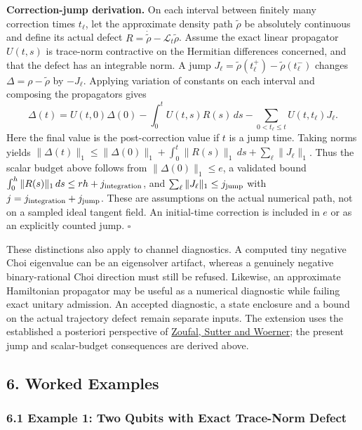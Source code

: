 \documentclass[
  11pt,
]{article}
\begin{document}
\textbf{Correction-jump derivation.} On each interval between finitely many correction times \(t_\ell\), let the approximate density path \(\widetilde\rho\) be absolutely continuous and define its actual defect \(R=\dot{\widetilde\rho}-\mathcal L_t\widetilde\rho\). Assume the exact linear propagator \(U(t,s)\) is trace-norm contractive on the Hermitian differences concerned, and that the defect has an integrable norm. A jump \(J_\ell=\widetilde\rho(t_\ell^+)-\widetilde\rho(t_\ell^-)\) changes \(\Delta=\rho-\widetilde\rho\) by \(-J_\ell\). Applying variation of constants on each interval and composing the propagators gives
\[
\Delta(t)=U(t,0)\Delta(0)-\int_0^t U(t,s)R(s)\,ds
-\sum_{0<t_\ell\le t}U(t,t_\ell)J_\ell.
\]
Here the final value is the post-correction value if \(t\) is a jump time. Taking norms yields \(\|\Delta(t)\|_1\le\|\Delta(0)\|_1+\int_0^t\|R(s)\|_1\,ds+\sum_\ell\|J_\ell\|_1\). Thus the scalar budget above follows from \(\|\Delta(0)\|_1\le e\), a validated bound \(\int_0^h\|R(s)\|_1\,ds\le rh+j_{\rm integration}\), and \(\sum_\ell\|J_\ell\|_1\le j_{\rm jump}\) with \(j=j_{\rm integration}+j_{\rm jump}\). These are assumptions on the actual numerical path, not on a sampled ideal tangent field. An initial-time correction is included in \(e\) or as an explicitly counted jump. \(\square\)

These distinctions also apply to channel diagnostics. A computed tiny negative Choi eigenvalue can be an eigensolver artifact, whereas a genuinely negative binary-rational Choi direction must still be refused. Likewise, an approximate Hamiltonian propagator may be useful as a numerical diagnostic while failing exact unitary admission. An accepted diagnostic, a state enclosure and a bound on the actual trajectory defect remain separate inputs. The extension uses the established a posteriori perspective of \href{https://arxiv.org/abs/2108.00022v2}{Zoufal, Sutter and Woerner}; the present jump and scalar-budget consequences are derived above.

\subsection{6. Worked Examples}\label{worked-examples}

\subsubsection{6.1 Example 1: Two Qubits with Exact Trace-Norm Defect}\label{example-1-two-qubits-with-exact-trace-norm-defect}
\end{document}
